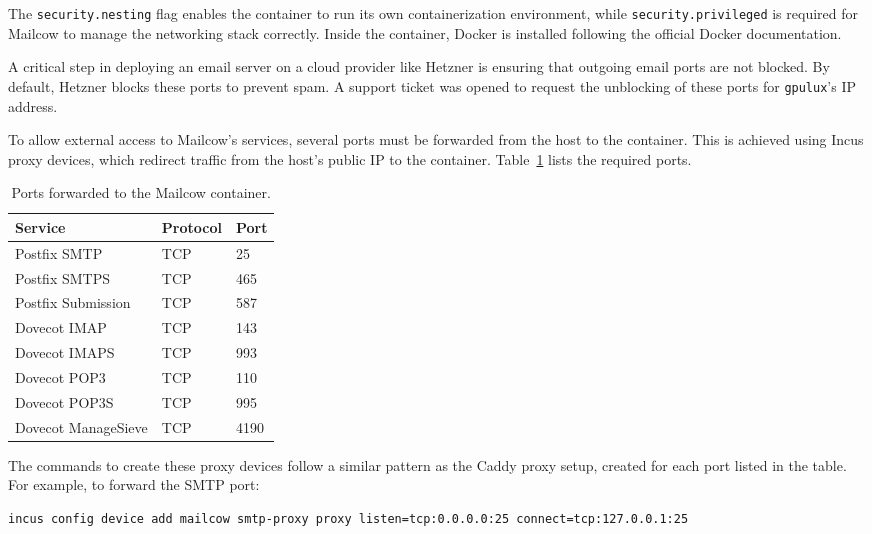 The \texttt{security.nesting} flag enables the container to run its own containerization environment, while \texttt{security.privileged} is required for Mailcow to manage the networking stack correctly. Inside the container, Docker is installed following the official Docker documentation.

A critical step in deploying an email server on a cloud provider like Hetzner is ensuring that outgoing email ports are not blocked. By default, Hetzner blocks these ports to prevent spam. A support ticket was opened to request the unblocking of these ports for \texttt{gpulux}'s IP address.

To allow external access to Mailcow's services, several ports must be forwarded from the host to the container. This is achieved using Incus proxy devices, which redirect traffic from the host's public IP to the container. Table~\ref{tab:mailcow-ports} lists the required ports.

\begin{table}[H]
    \centering
    \caption{Ports forwarded to the Mailcow container\cite{mailcow-prerequisites}.}
    \label{tab:mailcow-ports}
    \begin{tabular}{lll}
        \rowcolor{udcpink!25}
        \textbf{Service} & \textbf{Protocol} & \textbf{Port} \\
        \hline
        Postfix SMTP & TCP & 25 \\
        Postfix SMTPS & TCP & 465 \\
        Postfix Submission & TCP & 587 \\
        Dovecot IMAP & TCP & 143 \\
        Dovecot IMAPS & TCP & 993 \\
        Dovecot POP3 & TCP & 110 \\
        Dovecot POP3S & TCP & 995 \\
        Dovecot ManageSieve & TCP & 4190 \\
    \end{tabular}
\end{table}

The commands to create these proxy devices follow a similar pattern as the Caddy proxy setup, created for each port listed in the table. For example, to forward the SMTP port:

\begin{lstlisting}[language=bash,caption={Example of forwarding a port to the Mailcow container.}]
incus config device add mailcow smtp-proxy proxy listen=tcp:0.0.0.0:25 connect=tcp:127.0.0.1:25
\end{lstlisting}

